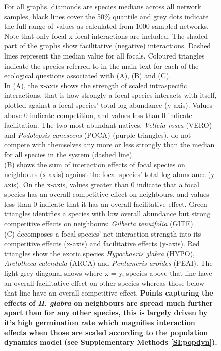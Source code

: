 \documentclass[a4,12pt]{article}
\begin{document}
    \addtocounter{figure}{-1}
    \begin{figure} [t!]
        \caption{For all graphs, diamonds are species medians across all network samples, black lines cover the 50\% quantile and grey dots indicate the full range of values as calculated from 1000 sampled networks. Note that only focal x focal interactions are included. The shaded part of the graphs show facilitative (negative) interactions. Dashed lines represent the median value for all focals. Coloured triangles indicate the species referred to in the main text for each of the ecological questions associated with (A), (B) and (C). \\
        In (A), the x-axis shows the strength of scaled intraspecific interactions, that is how strongly a focal species interacts with itself, plotted against a focal species' total log abundance (y-axis). Values above $0$ indicate competition, and values less than $0$ indicate facilitation.  The two most abundant natives, \textit{Velleia rosea} (VERO) and \textit{Podolepsis canescens} (POCA) (purple triangles), do not compete with themselves any more or less strongly than the median for all species in the system (dashed line). \\
        (B) shows the sum of interaction effects of focal species on neighbours (x-axis) against the focal species' total log abundance (y-axis). On the x-axis, values greater than $0$ indicate that a focal species has an overall competitive effect on neighbours, and values less than $0$ indicate that it has an overall facilitative effect. Green triangles identifies a species with low overall abundance but strong competitive effects on neighbours: \textit{Gilberta tenuifolia} (GITE). \\
        (C) decomposes a focal species' net interaction strength into its competitive effects (x-axis) and facilitative effects (y-axis). Red triangles show the exotic species \textit{Hypochaeris glabra} (HYPO), \textit{Arctotheca calendula} (ARCA) and \textit{Pentameris aroides} (PEAI). The light grey diagonal shows where x = y, species above that line have an overall facilitative effect on other species whereas those below that line have an overall competitive effect. \textbf{Points capturing the effects of \textit{H. glabra} on neighbours are spread much further apart than for any other species, this is largely driven by it's high germination rate which magnifies interaction effects when those are scaled according to the population dynamics model (see Supplementary Methods \ref{SI:popdyn}).}} 
    \end{figure}

\clearpage
\newpage



\end{document}
